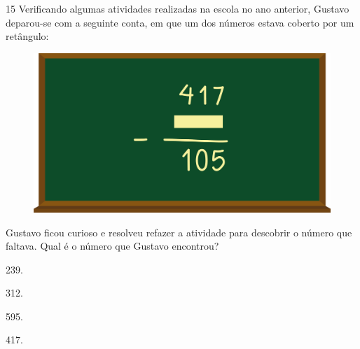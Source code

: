 \num{15} Verificando algumas atividades realizadas na escola no ano anterior, Gustavo deparou-se com a seguinte conta, em que um dos números estava
coberto por um retângulo:

\begin{figure}[htpb!]
\centering  
\includegraphics[width=.5\textwidth]{./media/image122.png}
\end{figure}

Gustavo ficou curioso e resolveu refazer a atividade para descobrir o número que faltava. Qual é o número que Gustavo encontrou?

\begin{multicols}{2}
\begin{escolha}
\item
  239.
\item
  312.
\item
  595.
\item
  417.
\end{escolha}
\end{multicols}



